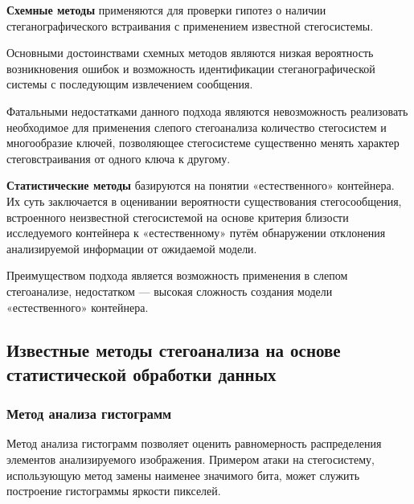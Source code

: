 \textbf{Схемные методы} применяются для проверки гипотез о наличии стеганографического встраивания с применением известной стегосистемы.

Основными достоинствами схемных методов являются низкая вероятность возникновения ошибок и возможность идентификации стеганографической системы с последующим извлечением сообщения.

Фатальными недостатками данного подхода являются невозможность реализовать необходимое для применения слепого стегоанализа количество стегосистем и многообразие ключей, позволяющее стегосистеме существенно менять характер стеговстраивания от одного ключа к другому.

\textbf{Статистические методы} базируются на понятии «естественного» контейнера. Их суть заключается в оценивании вероятности существования стегосообщения, встроенного неизвестной стегосистемой на основе критерия близости исследуемого контейнера к «естественному» путём обнаружении отклонения анализируемой информации от ожидаемой модели.

Преимуществом подхода является возможность применения в слепом стегоанализе, недостатком — высокая сложность создания модели «естественного» контейнера.

\subsection{Известные методы стегоанализа на основе статистической обработки данных}

\subsubsection{Метод анализа гистограмм}

Метод анализа гистограмм позволяет оценить равномерность распределения элементов анализируемого изображения. Примером атаки на стегосистему, использующую метод замены наименее значимого бита, может служить построение гистограммы яркости пикселей.

